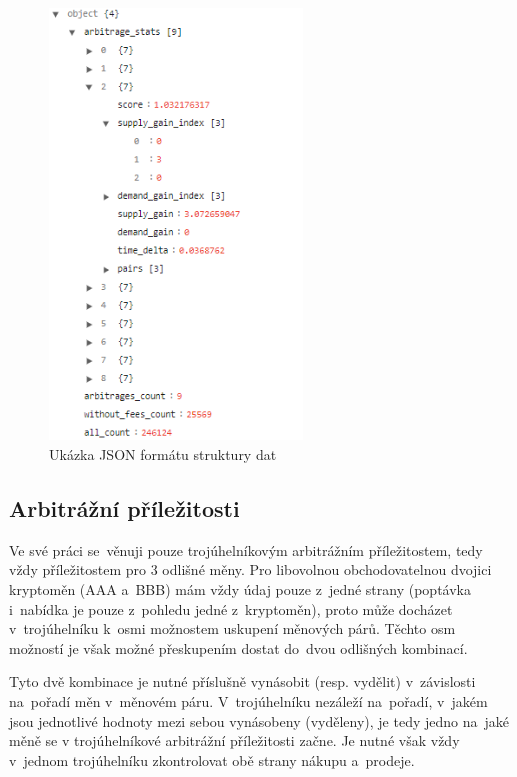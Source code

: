 \documentclass[thesis=B,czech]{FITthesis}[2019/03/21]
\begin{document}
\begin{figure}[h]\centering
	\includegraphics[width=0.6\textwidth]{images/json_data.PNG}
	\caption{Ukázka JSON formátu struktury dat}\label{json_data}
\end{figure}
\subsection{Arbitrážní příležitosti}
Ve své práci se~věnuji pouze trojúhelníkovým arbitrážním příležitostem, tedy vždy příležitostem pro 3 odlišné měny. Pro libovolnou obchodovatelnou dvojici kryptoměn (AAA a~BBB) mám vždy údaj pouze z~jedné strany (poptávka i~nabídka je pouze z~pohledu jedné z~kryptoměn), proto může docházet v~trojúhelníku k~osmi možnostem uskupení měnových párů. Těchto osm \linebreak možností je však možné přeskupením dostat do~dvou odlišných kombinací.

Tyto dvě kombinace je nutné příslušně vynásobit (resp. vydělit) v~závislosti na~pořadí měn v~měnovém páru. V~trojúhelníku nezáleží na~pořadí, v~jakém jsou jednotlivé hodnoty mezi sebou vynásobeny (vyděleny), je tedy jedno na~jaké měně se v trojúhelníkové arbitrážní příležitosti začne. Je nutné však vždy v~jednom trojúhelníku zkontrolovat obě strany nákupu a~prodeje.
\end{document}
